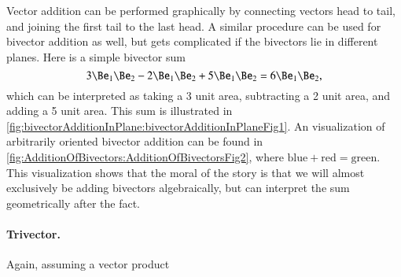 Vector addition can be performed graphically by connecting vectors head to tail, and joining the first tail to the last head.  A similar procedure can be used for bivector addition as well, but gets complicated if the bivectors lie in different planes.  Here is a simple bivector sum
\begin{dmath}\label{eqn:multivector:160}
3 \Be_1 \Be_2 - 2 \Be_1 \Be_2 + 5 \Be_1 \Be_2 = 6 \Be_1 \Be_2,
\end{dmath}
which can be interpreted as taking a 3 unit area, subtracting a 2 unit area, and adding a 5 unit area.  This sum is illustrated in
\cref{fig:bivectorAdditionInPlane:bivectorAdditionInPlaneFig1}.
An visualization of arbitrarily oriented bivector addition can be found in
\cref{fig:AdditionOfBivectors:AdditionOfBivectorsFig2}, where \( \text{blue} + \text{red} = \text{green} \).  This visualization shows that the
moral of the story is that we will almost exclusively be adding bivectors algebraically, but can interpret the sum geometrically after the fact.

\paragraph{Trivector.}

Again, assuming a vector product


